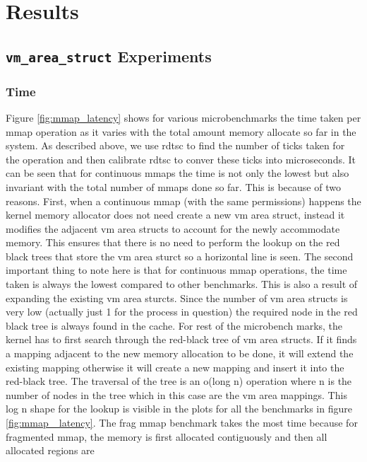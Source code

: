 \documentclass[twocolumn,11pt]{article}
\begin{document}
\section{Results}

\subsection{\texttt{vm\_area\_struct} Experiments}

\subsubsection{Time}

Figure \ref{fig:mmap_latency} shows for various microbenchmarks the time taken
per mmap operation as it varies with the total amount memory allocate so far in
the system. As described above, we use rdtsc to find the number of ticks taken
for the operation and then calibrate rdtsc to conver these ticks into
microseconds. It can be seen that for continuous mmaps the time is not only the
lowest but also invariant with the total number of mmaps done so far. This is
because of two reasons. First, when a continuous mmap (with the same
permissions) happens the kernel memory allocator does not need create a new vm
area struct, instead it modifies the adjacent vm area structs to account for the
newly accommodate memory. This ensures that there is no need to perform the
lookup on the red black trees that store the vm area sturct so a horizontal line
is seen. The second important thing to note here is that for continuous mmap
operations, the time taken is always the lowest compared to other benchmarks.
This is also a result of expanding the existing vm area sturcts. Since the
number of vm area structs is very low (actually just 1 for the process in
question) the required node in the red black tree is always found in the cache.
For rest of the microbench marks, the kernel has to first search through the
red-black tree of vm area structs. If it finds a mapping adjacent to the new
memory allocation to be done, it will extend the existing mapping otherwise it
will create a new mapping and insert it into the red-black tree. The traversal
of the tree is an o(long n) operation where n is the number of nodes in the tree
which in this case are the vm area mappings. This log n shape for the lookup is
visible in the plots for all the benchmarks in figure \ref{fig:mmap_ latency}.
The frag mmap benchmark takes the most time because for fragmented mmap, the
memory is first allocated contiguously and then all allocated regions are
\end{document}
